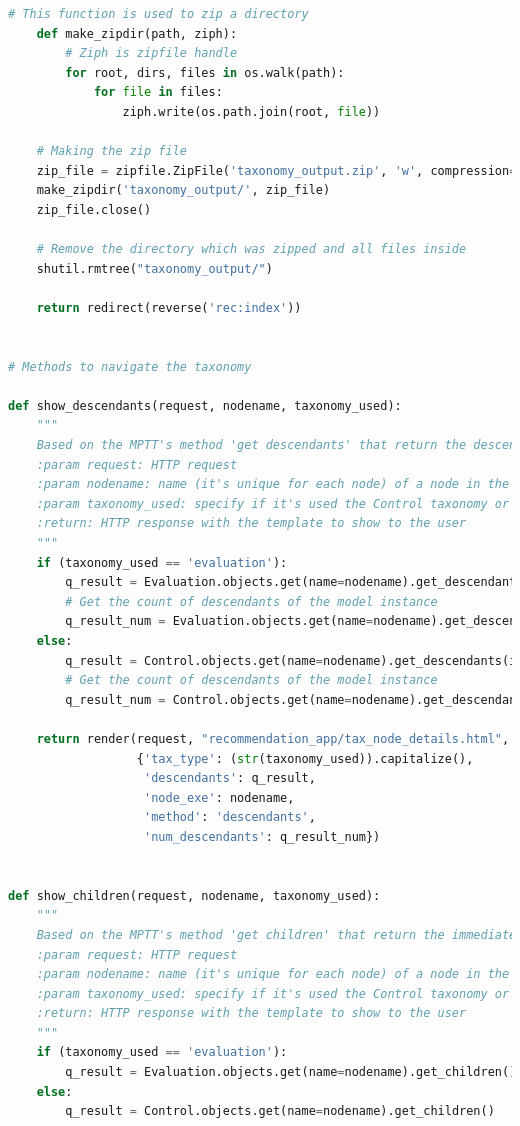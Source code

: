 \begin{lstlisting}[language=Python, caption={Parti principali del codice delle View della soluzione per gestire la navigazione 
    delle tassonomie, quella delle Evaluation e quella dei Controlli}]
    # This function is used to zip a directory
    def make_zipdir(path, ziph):
        # Ziph is zipfile handle
        for root, dirs, files in os.walk(path):
            for file in files:
                ziph.write(os.path.join(root, file))

    # Making the zip file
    zip_file = zipfile.ZipFile('taxonomy_output.zip', 'w', compression=zipfile.ZIP_DEFLATED)
    make_zipdir('taxonomy_output/', zip_file)
    zip_file.close()

    # Remove the directory which was zipped and all files inside
    shutil.rmtree("taxonomy_output/")

    return redirect(reverse('rec:index'))


# Methods to navigate the taxonomy

def show_descendants(request, nodename, taxonomy_used):
    """
    Based on the MPTT's method 'get descendants' that return the descendants of a model instance, in tree order
    :param request: HTTP request
    :param nodename: name (it's unique for each node) of a node in the taxonomy
    :param taxonomy_used: specify if it's used the Control taxonomy or the Evaluation taxonomy
    :return: HTTP response with the template to show to the user
    """
    if (taxonomy_used == 'evaluation'):
        q_result = Evaluation.objects.get(name=nodename).get_descendants(include_self=False)
        # Get the count of descendants of the model instance
        q_result_num = Evaluation.objects.get(name=nodename).get_descendant_count()
    else:
        q_result = Control.objects.get(name=nodename).get_descendants(include_self=False)
        # Get the count of descendants of the model instance
        q_result_num = Control.objects.get(name=nodename).get_descendant_count()

    return render(request, "recommendation_app/tax_node_details.html",
                  {'tax_type': (str(taxonomy_used)).capitalize(),
                   'descendants': q_result,
                   'node_exe': nodename,
                   'method': 'descendants',
                   'num_descendants': q_result_num})


def show_children(request, nodename, taxonomy_used):
    """
    Based on the MPTT's method 'get children' that return the immediate children of a model instance, in tree order
    :param request: HTTP request
    :param nodename: name (it's unique for each node) of a node in the taxonomy
    :param taxonomy_used: specify if it's used the Control taxonomy or the Evaluation taxonomy
    :return: HTTP response with the template to show to the user
    """
    if (taxonomy_used == 'evaluation'):
        q_result = Evaluation.objects.get(name=nodename).get_children()
    else:
        q_result = Control.objects.get(name=nodename).get_children()


\end{lstlisting}
